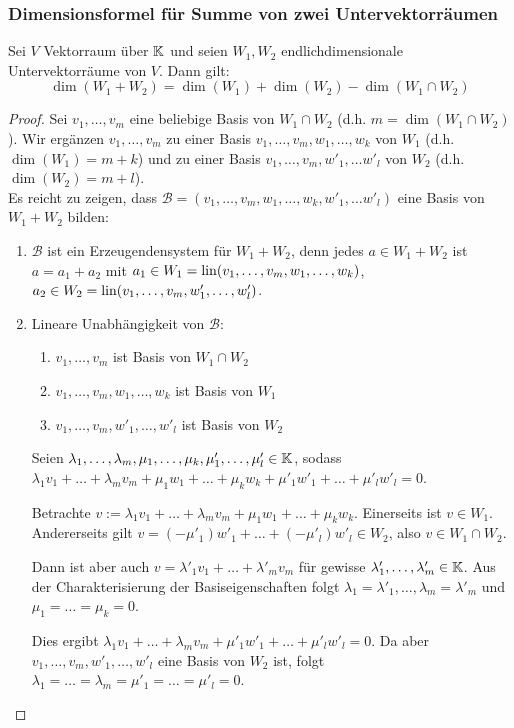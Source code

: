 \subsubsection{Dimensionsformel für Summe von zwei Untervektorräumen}
\begin{thm}
	Sei $ V $ Vektorraum über $ \mathbb K $ und seien $ W_1, W_2 $ endlichdimensionale Untervektorräume von $ V $. Dann gilt:
	\begin{equation}
		\dim(W_1 + W_2) = \dim(W_1) + \dim(W_2) - \dim(W_1 \cap W_2)
	\end{equation}
\end{thm}
\begin{proof}
	Sei $ v_1, \ldots, v_m $ eine beliebige Basis von $ W_1 \cap W_2 $ (d.h. $ m = \dim(W_1 \cap W_2) $). Wir ergänzen $ v_1, \ldots, v_m $ zu einer Basis $ v_1, \ldots, v_m, w_1, \ldots, w_k $ von $ W_1 $ (d.h. $ \dim(W_1) = m + k $) und zu einer Basis $ v_1, \ldots, v_m, w'_1, \ldots w'_l $ von $ W_2 $ (d.h. $ \dim(W_2) = m + l $).\\[10pt]
	Es reicht zu zeigen, dass $ \mathcal{B} = ( v_1, \ldots, v_m,w_1, \ldots, w_k, w'_1, \ldots w'_l ) $ eine Basis von $ W_1 + W_2 $ bilden:
	\begin{enumerate}
		\item
			$ \mathcal{B} $ ist ein Erzeugendensystem für $ W_1 + W_2 $, denn jedes $ a \in W_1 + W_2 $ ist $ a = a_1 + a_2 $ mit $ a_1 \in W_1 = \operatorname{lin}( v_1, \ldots, v_m, w_1, \ldots, w_k)$, $ a_2 \in W_2 = \operatorname{lin}( v_1, \ldots, v_m, w'_1, \ldots, w'_l) $.
		\item
			Lineare Unabhängigkeit von $ \mathcal{B} $: 
			\begin{enumerate}
				\item
					$ v_1, \ldots, v_m $ ist Basis von $ W_1 \cap W_2 $
				\item
					$ v_1, \ldots, v_m, w_1, \ldots, w_k $ ist Basis von $ W_1 $
				\item
					$ v_1, \ldots, v_m, w'_1, \ldots, w'_l $ ist Basis von $ W_2 $
			\end{enumerate}
			Seien $ \lambda_1, \ldots, \lambda_m, \mu_1, \ldots, \mu_k, \mu'_1, \ldots, \mu'_l \in \mathbb K $, sodass $ \lambda_1v_1 + \ldots + \lambda_mv_m + \mu_1w_1 + \ldots + \mu_kw_k + \mu'_1w'_1 + \ldots + \mu'_lw'_l = 0 $.
			
			Betrachte $ v := \lambda_1v_1 + \ldots + \lambda_mv_m + \mu_1w_1 + \ldots + \mu_kw_k $.
			Einerseits ist $ v \in W_1 $. Andererseits gilt $ v = (-\mu'_1)w'_1 + \ldots + (-\mu'_l)w'_l \in W_2 $, also $ v \in W_1 \cap W_2 $.
			
			Dann ist aber auch $ v = \lambda'_1v_1 + \ldots + \lambda'_mv_m $ für gewisse $ \lambda'_1, \ldots, \lambda'_m \in \mathbb K $.
			Aus der Charakterisierung der Basiseigenschaften folgt $ \lambda_1 = \lambda'_1, \ldots, \lambda_m = \lambda'_m $ und $ \mu_1 = \ldots = \mu_k = 0 $.
			
			Dies ergibt $ \lambda_1v_1 + \ldots + \lambda_mv_m + \mu'_1w'_1 + \ldots + \mu'_lw'_l = 0 $. Da aber $ v_1, \ldots, v_m, w'_1, \ldots, w'_l $ eine Basis von $ W_2 $ ist, folgt $ \lambda_1 = \ldots = \lambda_m = \mu'_1 = \ldots = \mu'_l = 0 $. \qedhere
	\end{enumerate}
\end{proof}

